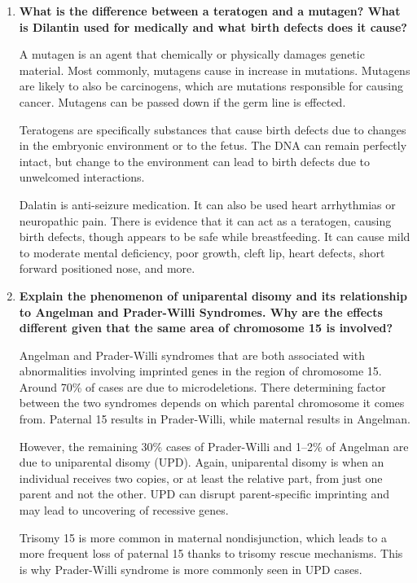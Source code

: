 \documentclass[basic]{inVerba-notes}
\begin{document}
\begin{enumerate}
    \qquad

    \item \textbf{What is the difference between a teratogen and a mutagen? What is Dilantin used for medically and what birth defects does it cause?}
    
    A mutagen is an agent that chemically or physically damages genetic material. Most commonly, mutagens cause in increase in mutations. Mutagens are likely to also be carcinogens, which are mutations responsible for causing cancer. Mutagens can be passed down if the germ line is effected. 

    Teratogens are specifically substances that cause birth defects due to changes in the embryonic environment or to the fetus. The DNA can remain perfectly intact, but change to the environment can lead to birth defects due to unwelcomed interactions. 

    Dalatin is anti-seizure medication. It can also be used heart arrhythmias or neuropathic pain. There is evidence that it can act as a teratogen, causing birth defects, though appears to be safe while breastfeeding. It can cause mild to moderate mental deficiency, poor growth, cleft lip, heart defects, short forward positioned nose, and more.

    \item \textbf{Explain the phenomenon of uniparental disomy and its relationship to Angelman and Prader-Willi Syndromes. Why are the effects different given that the same area of chromosome 15 is involved?}
    
    Angelman and Prader-Willi syndromes that are both associated with abnormalities involving imprinted genes in the region of chromosome 15. Around 70\% of cases are due to microdeletions. There determining factor between the two syndromes depends on which parental chromosome it comes from. Paternal 15 results in Prader-Willi, while maternal results in Angelman.

    However, the remaining 30\% cases of Prader-Willi and 1--2\% of Angelman are due to uniparental disomy (UPD). Again, uniparental disomy is when an individual receives two copies, or at least the relative part, from just one parent and not the other. UPD can disrupt parent-specific imprinting and may lead to uncovering of recessive genes.

    Trisomy 15 is more common in maternal nondisjunction, which leads to a more frequent loss of paternal 15 thanks to trisomy rescue mechanisms. This is why Prader-Willi syndrome is more commonly seen in UPD cases. 
    

\end{enumerate}
\end{document}
